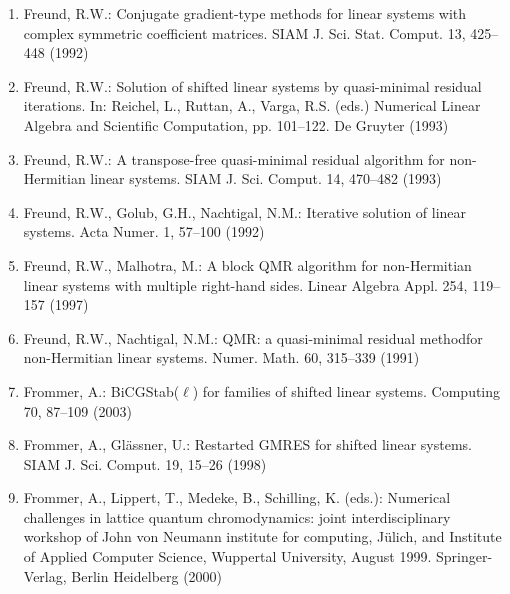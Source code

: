 \begin{enumerate}[label=\arabic*.,ref=\arabic*,leftmargin=3em]
\item\label{bib:source-61}Freund, R.W.: Conjugate gradient-type methods for linear systems with complex symmetric coefficient matrices. SIAM J. Sci. Stat. Comput. 13, 425–448 (1992)

\item\label{bib:source-62}Freund, R.W.: Solution of shifted linear systems by quasi-minimal residual iterations. In: Reichel, L., Ruttan, A., Varga, R.S. (eds.) Numerical Linear Algebra and Scientific Computation, pp. 101–122. De Gruyter (1993)

\item\label{bib:source-63}Freund, R.W.: A transpose-free quasi-minimal residual algorithm for non-Hermitian linear systems. SIAM J. Sci. Comput. 14, 470–482 (1993)

\item\label{bib:source-64}Freund, R.W., Golub, G.H., Nachtigal, N.M.: Iterative solution of linear systems. Acta Numer. 1, 57–100 (1992)

\item\label{bib:source-65}Freund, R.W., Malhotra, M.: A block QMR algorithm for non-Hermitian linear systems with multiple right-hand sides. Linear Algebra Appl. 254, 119–157 (1997)

\item\label{bib:source-66}Freund, R.W., Nachtigal, N.M.: QMR: a quasi-minimal residual method\newline{}for non-Hermitian linear systems. Numer. Math. 60, 315–339 (1991)

\item\label{bib:source-67}Frommer, A.: BiCGStab($\ell$) for families of shifted linear systems. Computing 70, 87–109 (2003)

\item\label{bib:source-68}Frommer, A., Glässner, U.: Restarted GMRES for shifted linear systems. SIAM J. Sci. Comput. 19, 15–26 (1998)

\item\label{bib:source-69}Frommer, A., Lippert, T., Medeke, B., Schilling, K. (eds.): Numerical challenges in lattice quantum chromodynamics: joint interdisciplinary workshop of John von Neumann institute for computing, Jülich, and Institute of Applied Computer Science, Wuppertal University, August 1999. Springer-Verlag, Berlin Heidelberg (2000)


\end{enumerate}
